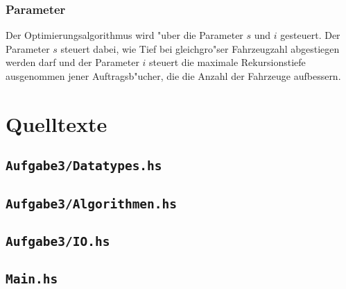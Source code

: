 \documentclass{scrreprt}
\begin{document}
\subsection {Parameter}
Der Optimierungsalgorithmus wird "uber die Parameter $s$ und $i$ gesteuert. Der
Parameter $s$ steuert dabei, wie Tief bei gleichgro"ser Fahrzeugzahl abgestiegen
werden darf und der Parameter $i$ steuert die maximale Rekursionstiefe
ausgenommen jener Auftragsb"ucher, die die Anzahl der Fahrzeuge aufbessern.

\chapter{Quelltexte}

\section{\texttt{Aufgabe3/Datatypes.hs}}
%

\section{\texttt{Aufgabe3/Algorithmen.hs}}
%

\section{\texttt{Aufgabe3/IO.hs}}
%

\section{\texttt{Main.hs}}
%
\end{document}
